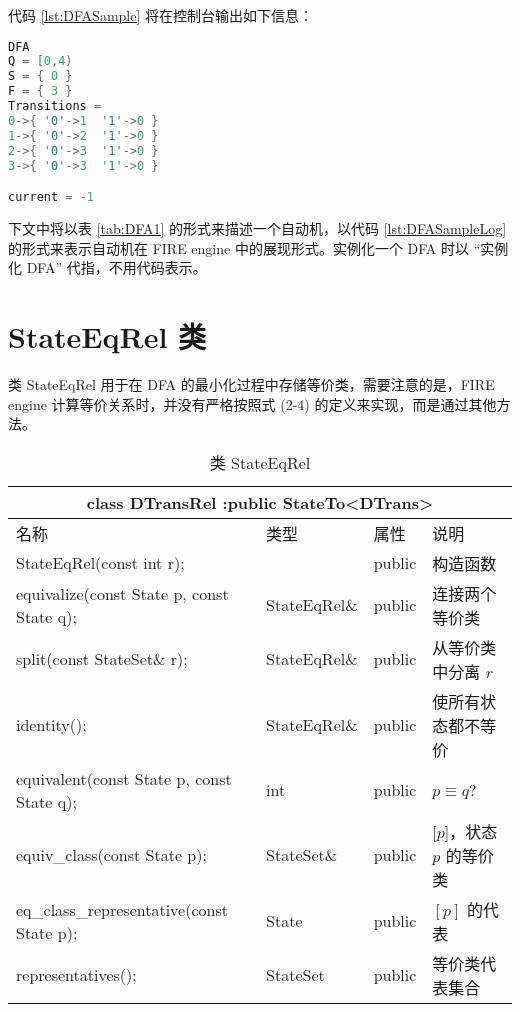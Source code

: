 
	

代码 \ref{lst:DFASample} 将在控制台输出如下信息：

\begin{lstlisting}[language=C++,label={lst:DFASampleLog},caption={图\ref{fig:DFA1}中自动机在 FIRE engine 中的表现形式}]
DFA
Q = [0,4)
S = { 0 }
F = { 3 }
Transitions =
0->{ '0'->1  '1'->0 }
1->{ '0'->2  '1'->0 }
2->{ '0'->3  '1'->0 }
3->{ '0'->3  '1'->0 }

current = -1
\end{lstlisting}

下文中将以表 \ref{tab:DFA1} 的形式来描述一个自动机，以代码 \ref{lst:DFASampleLog} 的形式来表示自动机在 FIRE engine 中的展现形式。实例化一个 DFA 时以 “实例化 DFA” 代指，不用代码表示。 

\section{ StateEqRel 类}\label{sec:stateeqrel-def}

类 StateEqRel 用于在 DFA 的最小化过程中存储等价类，需要注意的是，FIRE engine 计算等价关系时，并没有严格按照式 (2-4) 的定义来实现，而是通过其他方法。

\begin{table}[!htbp]
    \caption{类 StateEqRel}
    \label{tab:Class-StateEqRel}
    \centering
    \small%
    \setlength{\tabcolsep}{4pt}%
    \renewcommand{\arraystretch}{1.2}%
        \begin{tabular}{llll} %
        \toprule 
         \multicolumn{4}{c}{class DTransRel :public StateTo<DTrans>} \\
        \midrule
        名称& 类型 & 属性  &\mbox{说明} \\
        \midrule 
        StateEqRel(const int r); & & public & 构造函数 \\
        equivalize(const State p, const State q); & StateEqRel\& & public & 连接两个等价类 \\
        split(const StateSet\& r); & StateEqRel\& & public & 从等价类中分离 $r$ \\
        identity(); & StateEqRel\& & public & 使所有状态都不等价 \\
        equivalent(const State p, const State q); & int & public & $p\equiv q $? \\
        equiv\_class(const State p); & StateSet\& & public & $[p$]，状态 $p$ 的等价类 \\
        eq\_class\_representative(const State p); & State & public & $[p]$ 的代表 \\
        representatives(); & StateSet & public & 等价类代表集合 \\
        \bottomrule 
    \end{tabular}
\end{table}

